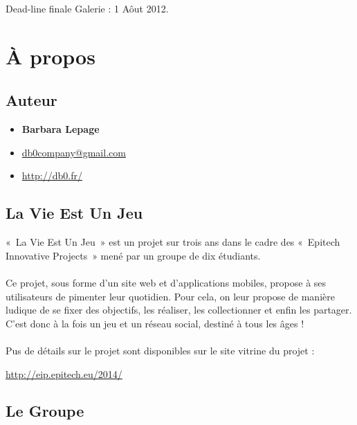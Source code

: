 \documentclass{life-fr}
\begin{document}
Dead-line finale Galerie : 1 Aôut 2012.\\


\chapter{À propos}

\section{Auteur}

\begin{itemize}
  \item \textbf{Barbara Lepage}
  \item \href{mailto:db0company@gmail.com}{db0company@gmail.com}
  \item \url{http://db0.fr/}
\end{itemize}

\section{La Vie Est Un Jeu}

«~La Vie Est Un Jeu~» est un projet sur trois ans dans le cadre des «~Epitech
Innovative Projects~» mené par un groupe de dix étudiants.\\
\\
Ce projet, sous forme d’un site web et d’applications mobiles, propose à ses
utilisateurs de pimenter leur quotidien. Pour cela, on leur propose de manière
ludique de se fixer des objectifs, les réaliser, les collectionner et enfin les
partager.\\
C’est donc à la fois un jeu et un réseau social, destiné à tous les âges !\\
\\
Pus de détails sur le projet sont disponibles sur le site vitrine du projet :\\
\begin{center}
  \url{http://eip.epitech.eu/2014/}
\end{center}

\newpage

\section{Le Groupe}
\end{document}
